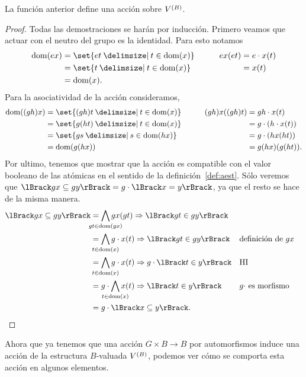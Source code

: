 \documentclass[letterpaper,DIV=15,12pt]{scrartcl}
\DeclarePairedDelimiter{\vb}{\lBrack}{\rBrack}             %
\DeclareMathOperator{\dom}{dom}                            %
\newcommand{\st}{}
\newcommand{\SetSymbol}[1][]{%
\nonscript\:#1\vert
\allowbreak
\nonscript\:
\mathopen{}}
\renewcommand\st{\SetSymbol[\delimsize]}
\begin{document}
\begin{proposition}
    La función anterior define una acción sobre \(\mb\).
\end{proposition}
\begin{proof}
    Todas las demostraciones se harán por inducción.
    Primero veamos que actuar con el neutro del grupo es la identidad. Para esto
    notamos
    \begin{alignat*}{2}
        \dom(ex)&=\set{et\st t\in\dom(x)} &\qquad ex(et)&=e\cdot x(t)\\
        &=\set{t\st t\in\dom(x)} & &=x(t)\\
        &=\dom(x).
    \end{alignat*}
    Para la asociatividad de la acción consideramos,
    \begin{alignat*}{2}
        \dom((gh)x)&=\set{(gh)t\st t\in\dom(x)} 
            &\qquad (gh)x((gh)t)&=gh\cdot x(t)\\
        &=\set{g(ht)\st t\in\dom(x)} & &=g\cdot(h\cdot x(t))\\
        &=\set{gs\st s\in\dom(hx)} & &=g\cdot(hx(ht))\\
        &=\dom(g(hx)) & &=g(hx)(g(ht)).
    \end{alignat*}
    Por ultimo, tenemos que mostrar que la acción es compatible con el valor
    booleano de las atómicas en el sentido de la definición~\ref{def:aest}. Sólo
    veremos que \(\vb{gx\subseteq gy}=g\cdot\vb{x=y}\), ya que el resto se hace
    de la misma manera.
    \begin{align*}
        \vb{gx\subseteq gy}
        &=\bigwedge_{\mathclap{gt\in\dom(gx)}}gx(gt)\Rightarrow\vb{gt\in gy}\\
        &=\bigwedge_{\mathclap{t\in\dom(x)}}g\cdot x(t)\Rightarrow\vb{gt\in gy}
        && \text{definición de \(gx\)}\\
        &=\bigwedge_{\mathclap{t\in\dom(x)}}g\cdot x(t)\Rightarrow g\cdot\vb{t\in y}
        && \text{HI}\\
        &=g\cdot\bigwedge_{\mathclap{t\in\dom(x)}}x(t)\Rightarrow\vb{t\in y}
        && \text{\(g\cdot\) es morfismo}\\
        &=g\cdot\vb{x\subseteq y}. \tag*{\qedhere}
    \end{align*}
\end{proof}

Ahora que ya tenemos que una acción \(G\times B\to B\) por automorfismos induce
una acción de la estructura \(B\)-valuada \(\mb\), podemos ver cómo se comporta
esta acción en algunos elementos.
\end{document}
